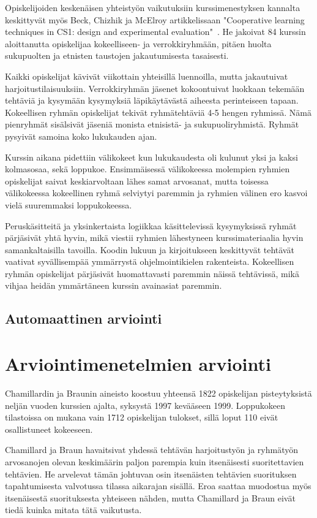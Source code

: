 \documentclass[finnish]{../tktltiki2}
\theoremstyle{definition}
\theoremstyle{remark}
\begin{document}
Opiskelijoiden keskenäisen yhteistyön vaikutuksiin kurssimenestyksen kannalta keskittyvät myös Beck, Chizhik ja McElroy artikkelissaan "Cooperative learning techniques in CS1: design and experimental evaluation"~\cite{BCM05}. He jakoivat 84 kurssin aloittanutta opiskelijaa kokeelliseen- ja verrokkiryhmään, pitäen huolta sukupuolten ja etnisten taustojen jakautumisesta tasaisesti.

Kaikki opiskelijat kävivät viikottain yhteisillä luennoilla, mutta jakautuivat harjoitustilaisuuksiin. Verrokkiryhmän jäsenet kokoontuivat luokkaan tekemään tehtäviä ja kysymään kysymyksiä läpikäytävästä aiheesta perinteiseen tapaan. Kokeellisen ryhmän opiskelijat tekivät ryhmätehtäviä 4-5 hengen ryhmissä. Nämä pienryhmät sisälsivät jäseniä monista etnisistä- ja sukupuoliryhmistä. Ryhmät pysyivät samoina koko lukukauden ajan.

Kurssin aikana pidettiin välikokeet kun lukukaudesta oli kulunut yksi ja kaksi kolmasosaa, sekä loppukoe. Ensimmäisessä välikokeessa molempien ryhmien opiskelijat saivat keskiarvoltaan lähes samat arvosanat, mutta toisessa välikokeessa kokeellinen ryhmä selviytyi paremmin ja ryhmien välinen ero kasvoi vielä suuremmaksi loppukokeessa.

Peruskäsitteitä ja yksinkertaista logiikkaa käsittelevissä kysymyksissä ryhmät pärjäsivät yhtä hyvin, mikä viestii ryhmien lähestyneen kurssimateriaalia hyvin samankaltaisilla tavoilla. Koodin lukuun ja kirjoitukseen keskittyvät tehtävät vaativat syvällisempää ymmärrystä ohjelmointikielen rakenteista. Kokeellisen ryhmän opiskelijat pärjäsivät huomattavasti paremmin näissä tehtävissä, mikä vihjaa heidän ymmärtäneen kurssin avainasiat paremmin.

\subsection{Automaattinen arviointi}



\section{Arviointimenetelmien arviointi}

Chamillardin ja Braunin aineisto koostuu yhteensä 1822 opiskelijan pisteytyksistä neljän vuoden kurssien ajalta, syksystä 1997 kevääseen 1999. Loppukokeen tilastoissa on mukana vain 1712 opiskelijan tulokset, sillä loput 110 eivät osallistuneet kokeeseen.

Chamillard ja Braun havaitsivat yhdessä tehtävän harjoitustyön ja ryhmä\-työn arvosanojen olevan keskimäärin paljon parempia kuin itsenäisesti suoritettavien tehtävien. He arvelevat tämän johtuvan osin itsenäisten tehtävien suorituksen tapahtumisesta valvotussa tilassa aikarajan sisällä. Eroa saattaa muodostua myös itsenäisestä suorituksesta yhteiseen nähden, mutta Chamillard ja Braun eivät tiedä kuinka mitata tätä vaikutusta.
\end{document}
